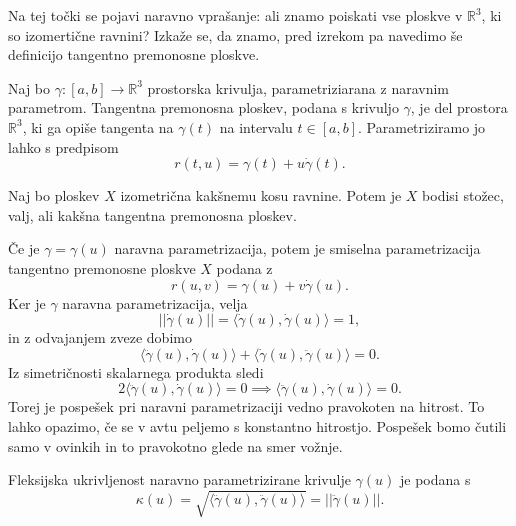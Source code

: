 Na tej točki se pojavi naravno vprašanje: ali znamo poiskati vse ploskve v $\mathbb{R}^3$, ki so izomertične ravnini?
Izkaže se, da znamo, pred izrekom pa navedimo še definicijo tangentno premonosne ploskve.
\begin{definicija}
  \label{def_tangentno_premonsna_ploskev}
   Naj bo $\gamma: [a,b] \to  \mathbb{R}^3$ prostorska krivulja, parametriziarana z naravnim parametrom. Tangentna premonosna ploskev,
   podana s krivuljo $\gamma$, je del prostora $\mathbb{R}^3$, ki ga opiše tangenta na $\gamma(t)$ na intervalu $t \in  [a,b]$. Parametriziramo jo lahko s predpisom \begin{equation*}
   r(t, u) = \gamma(t) + u\dot{\gamma}(t).
   \end{equation*}  
     
  \end{definicija}
\begin{izrek}
\label{izr_izometricnost_ploskev_ravnini}
Naj bo ploskev $X$ izometrična kakšnemu kosu ravnine. Potem je $X$ bodisi stožec, valj, ali kakšna tangentna premonosna ploskev.
\end{izrek}



Če je $\gamma = \gamma(u)$ naravna parametrizacija, potem je smiselna parametrizacija tangentno premonosne ploskve $X$
podana z 
\begin{equation*} r(u,v) = \gamma(u) + v \dot{\gamma}(u).\end{equation*}Ker je $\gamma$ naravna parametrizacija, velja \begin{equation*} \lvert\lvert \dot{\gamma}(u) \rvert\rvert = \langle \dot{\gamma}(u), \dot{\gamma}(u) \rangle  = 1, \end{equation*}in z odvajanjem zveze dobimo 
\begin{equation*} \langle \ddot{\gamma}(u) , \dot{\gamma}(u) \rangle + \langle \dot{\gamma}(u) , \ddot{\gamma}(u) \rangle = 0.  \end{equation*}
Iz simetričnosti skalarnega produkta sledi 
\begin{equation*} 2 \langle \ddot{\gamma}(u) , \dot{\gamma}(u) \rangle = 0 \implies \langle \ddot{\gamma}(u) , \dot{\gamma}(u) \rangle = 0. \end{equation*}
Torej je pospešek pri naravni parametrizaciji vedno pravokoten na hitrost. To lahko opazimo, če se v avtu peljemo s konstantno hitrostjo. Pospešek bomo čutili
samo v ovinkih in to pravokotno glede na smer vožnje.

\begin{definicija}
\label{def_fleksijska_ukrivljenost}
 Fleksijska ukrivljenost naravno parametrizirane krivulje $\gamma(u)$ je podana s 
 \begin{equation*} \kappa(u) = \sqrt{\langle \ddot{\gamma}(u), \ddot{\gamma}(u) \rangle } = \lvert\lvert \ddot{\gamma}(u) \rvert\rvert. \end{equation*}
\end{definicija}

